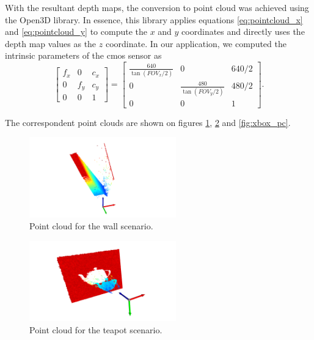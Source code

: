 \documentclass[journal]{IEEEtran}
\begin{document}
With the resultant depth maps, the conversion to point cloud was achieved using the Open3D \cite{Zhou2018} library. In essence, this library applies equations \ref{eq:pointcloud_x} and \ref{eq:pointcloud_y} to compute the $x$ and $y$ coordinates and directly uses the depth map values as the $z$ coordinate. In our application, we computed the intrinsic parameters of the \gls{cmos} sensor as
\begin{equation*}
    \begin{bmatrix}
        f_x & 0 & c_x \\
        0 & f_y & c_y \\
        0 & 0 & 1
    \end{bmatrix}  
    =
    \begin{bmatrix}
        \frac{640}{\tan(FOV_x / 2)} & 0 & 640/2 \\
        0 & \frac{480}{\tan(FOV_y / 2)} & 480/2 \\
        0 & 0 & 1
    \end{bmatrix}  
    .
\end{equation*}

The correspondent point clouds are shown on figures \ref{fig:wall_pc}, \ref{fig:teapot_pc} and \ref{fig:xbox_pc}.

\begin{figure}[!t]
    \centering
    \includegraphics[width=2.5in]{imgs/Wall/pc.png}
    \caption{Point cloud for the wall scenario.}
    \label{fig:wall_pc}
\end{figure}

\begin{figure}[!t]
    \centering
    \includegraphics[width=2.5in]{imgs/Teapod/pc.png}
    \caption{Point cloud for the teapot scenario.}
    \label{fig:teapot_pc}
\end{figure}
\end{document}
